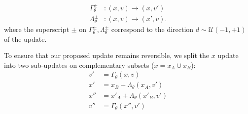 \documentclass[a4paper,11pt]{article}
\begin{document}
\begin{align}
\Gamma^{\pm}_{\theta}&: (x, v) \rightarrow (x, v') \\
\Lambda^{\pm}_{\theta}&: (x, v) \rightarrow (x', v).
\end{align}
%
where the superscript $\pm$ on $\Gamma^{\pm}_{\theta}, \Lambda^{\pm}_{\theta}$
correspond to the direction $d \sim \mathcal{U}(-1, +1)$ of the update.
%

To ensure that our proposed update remains reversible, we split the $x$ update
into two sub-updates on complementary subsets ($x = x_{A} \cup x_{B}$):
%
\begin{align}
v' &= \Gamma_{\theta}(x, v) \\
x' &= x_{B} + \Lambda_{\theta}(x_{A}, v') \\
x'' &= x'_{A} + \Lambda_{\theta}(x'_{B}, v') \\
v'' &= \Gamma_{\theta}(x'', v')
\end{align}
%
%
\end{document}
